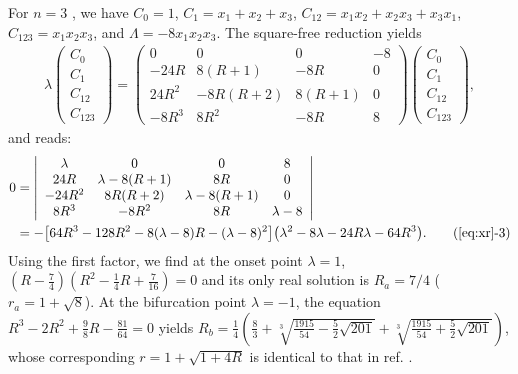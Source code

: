 \documentclass{ws-ijbc}
\begin{document}
For $n = 3$ \cite{saha, bechhoefer, gordon, burm, zhang},
we have
$C_0 = 1$,
$C_1 = x_1 + x_2 + x_3$,
$C_{12} = x_1 x_2 + x_2 x_3 + x_3 x_1$,
$C_{123} = x_1 x_2 x_3$,
and
$\Lambda = -8 x_1 x_2 x_3$.
%
The square-free reduction yields
%
%
%
\begin{align}
\lambda
\left( \begin{array}{c}
  C_0 \\
  C_1 \\
  C_{12} \\
  C_{123}
\end{array} \right)
=
\left( \begin{array}{cccc}
 0            & 0                 & 0               & -8 \\
 -24 R        & 8(R+1)            & -8R             & 0 \\
 24 R^2       & -8R(R+2)          & 8(R+1)          & 0 \\
 -8R^3        & 8R^2              & -8R             & 8
  \end{array} \right)
\left( \begin{array}{c}
  C_0 \\
  C_1 \\
  C_{12} \\
  C_{123}
\end{array} \right),
\end{align}
%
%
%
and  reads:
\begin{align}
  0
&=\left| \begin{array}{cccc}
 \lambda      & 0                 & 0               & 8 \\
 24 R         & \lambda - 8(R+1)  & 8R              & 0 \\
 -24 R^2      & 8R(R+2)           & \lambda-8(R+1)  & 0 \\
 8R^3         & -8R^2             & 8R              & \lambda-8
  \end{array} \right| \nonumber \\
&= -\big[
  64R^3 - 128 R^2 - 8 (\lambda - 8) R - (\lambda -8)^2
  \big]
  \big(
  \lambda^2 - 8\lambda - 24 R\lambda - 64 R^3
  \big).
  \tag{\ref{eq:xr}-3}
\label{eq:xr3}
\end{align}
%
Using the first factor, we find at the onset point
  $\lambda = 1$,
  $\left(
  R-\frac74
  \right)
  \left(
  R^2-\frac14 R + \frac{7}{16}
  \right)=0$
  and its only real solution is $R_a = 7/4$ ($r_a = 1+\sqrt 8$).
%
At the bifurcation point $\lambda = -1$,
  the equation $R^3-2R^2 + \frac{9}{8} R -\frac{81}{64}=0$
  yields
  $R_b = \frac14
      \left(
      \frac{8}{3} +
        \sqrt[3]{\frac{1915}{54} - \frac52\sqrt{201}}
       +\sqrt[3]{\frac{1915}{54} + \frac52\sqrt{201}}
      \right)$,
whose corresponding $r = 1+\sqrt{1+4R}$
is identical to that in ref. \cite{gordon, burm}.
%
\end{document}
